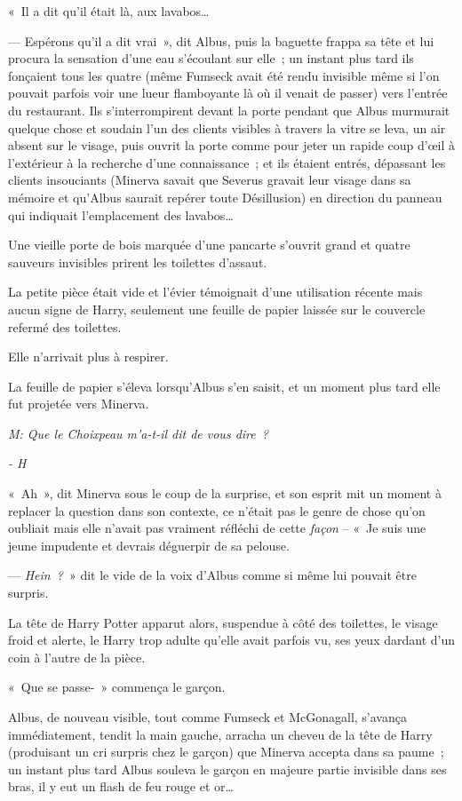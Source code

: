«~Il a dit qu'il était là, aux lavabos…

--- Espérons qu'il a dit vrai~», dit Albus, puis la baguette frappa sa tête et lui procura la sensation d'une eau s'écoulant sur elle~; un instant plus tard ils fonçaient tous les quatre (même Fumseck avait été rendu invisible même si l'on pouvait parfois voir une lueur flamboyante là où il venait de passer) vers l'entrée du restaurant.
Ils s'interrompirent devant la porte pendant que Albus murmurait quelque chose et soudain l'un des clients visibles à travers la vitre se leva, un air absent sur le visage, puis ouvrit la porte comme pour jeter un rapide coup d'œil à l'extérieur à la recherche d'une connaissance~; et ils étaient entrés, dépassant les clients insouciants (Minerva savait que Severus gravait leur visage dans sa mémoire et qu'Albus saurait repérer toute Désillusion) en direction du panneau qui indiquait l'emplacement des lavabos…

Une vieille porte de bois marquée d'une pancarte s'ouvrit grand et quatre sauveurs invisibles prirent les toilettes d'assaut.

La petite pièce était vide et l'évier témoignait d'une utilisation récente mais aucun signe de Harry, seulement une feuille de papier laissée sur le couvercle refermé des toilettes.

Elle n'arrivait plus à respirer.

La feuille de papier s'éleva lorsqu'Albus s'en saisit, et un moment plus tard elle fut projetée vers Minerva.

\emph{M: Que le Choixpeau m'a-t-il dit de vous dire~?}

\emph{- H}

«~Ah~», dit Minerva sous le coup de la surprise, et son esprit mit un moment à replacer la question dans son contexte, ce n'était pas le genre de chose qu'on oubliait mais elle n'avait pas vraiment réfléchi de cette \emph{façon} -- «~Je suis une jeune impudente et devrais déguerpir de sa pelouse.

--- \emph{Hein~?}~» dit le vide de la voix d'Albus comme si même lui pouvait être surpris.

La tête de Harry Potter apparut alors, suspendue à côté des toilettes, le visage froid et alerte, le Harry trop adulte qu'elle avait parfois vu, ses yeux dardant d'un coin à l'autre de la pièce.

«~Que se passe-~» commença le garçon.

Albus, de nouveau visible, tout comme Fumseck et McGonagall, s'avança immédiatement, tendit la main gauche, arracha un cheveu de la tête de Harry (produisant un cri surpris chez le garçon) que Minerva accepta dans sa paume~; un instant plus tard Albus souleva le garçon en majeure partie invisible dans ses bras, il y eut un flash de feu rouge et or…

